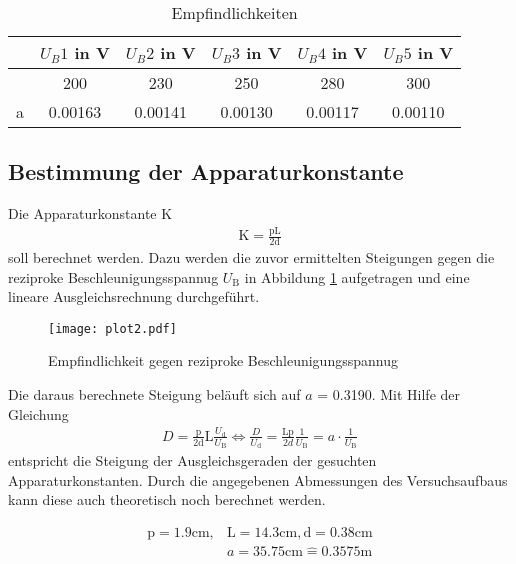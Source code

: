 \FloatBarrier
\begin{table}
  \centering
  \caption{Empfindlichkeiten}
  \label{tab:messwerte2}
  \begin{tabular}{c c c c c c}
  \toprule
   & $U_B 1$ in V & $U_B 2$ in V & $U_B 3$ in V & $U_B 4$ in V & $U_B 5$ in V \\
  \midrule
   & 200 & 230 & 250 & 280 & 300 \\
  \bottomrule
  a & 0.00163 & 0.00141 & 0.00130 & 0.00117 & 0.00110 \\
  \bottomrule
\end{tabular}
\end{table}

\noindent

\subsection{Bestimmung der Apparaturkonstante}
\label{sec:Apparaturkonstante}

Die Apparaturkonstante K
\begin{align*}
  \text{K} = \frac{\text{pL}}{\text{2d}}
\end{align*}
soll berechnet werden.
Dazu werden die zuvor ermittelten Steigungen gegen die reziproke Beschleunigungsspannug $U_\text{B}$ in Abbildung \ref{fig:plot2} aufgetragen und eine lineare Ausgleichsrechnung durchgeführt.

\FloatBarrier
\begin{figure}
  \centering
  \texttt{[image: plot2.pdf]}
  \caption{Empfindlichkeit gegen reziproke Beschleunigungsspannug}
  \label{fig:plot2}
\end{figure}

\noindent
Die daraus berechnete Steigung beläuft sich auf $a$ = 0.3190.
Mit Hilfe der Gleichung
\begin{align*}
  D = \frac{\text{p}}{\text{2d}}\text{L}\frac{U_\text{d}}{U_\text{B}} \Leftrightarrow \frac{D}{U_\text{d}} = \frac{\text{Lp}}{2d} \frac{1}{U_\text{B}} = a \cdot \frac{1}{U_\text{B}}
\end{align*}
entspricht die Steigung der Ausgleichsgeraden der gesuchten Apparaturkonstanten.
Durch die angegebenen Abmessungen des Versuchsaufbaus kann diese auch theoretisch noch berechnet werden.

\begin{align*}
  \text{p} = 1.9 \text{cm}, & \text{L} = 14.3 \text{cm}, \text{d} = 0.38 \text{cm} \\
  & a = 35.75 \text{cm}	\widehat{=} 0.3575 \text{m}
\end{align*}

